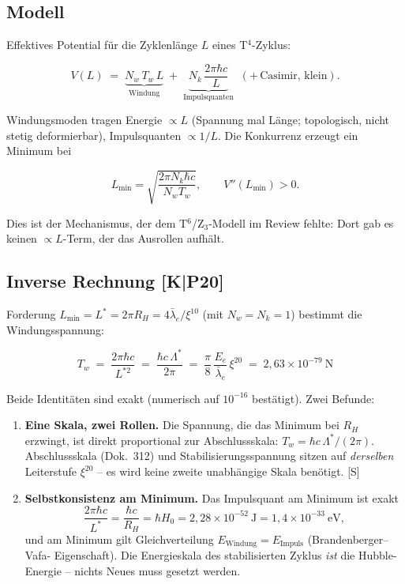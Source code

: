 \subsection{Modell}

Effektives Potential für die Zyklenlänge $L$ eines T$^4$-Zyklus:

\begin{equation}
  V(L) \;=\; \underbrace{N_w\,T_w\,L}_{\text{Windung}}
  \;+\; \underbrace{N_k\,\frac{2\pi\hbar c}{L}}_{\text{Impulsquanten}}
  \;\;(+\,\text{Casimir, klein}).
  \label{eq:pot}
\end{equation}

Windungsmoden tragen Energie $\propto L$ (Spannung mal Länge;
topologisch, nicht stetig deformierbar), Impulsquanten
$\propto 1/L$. Die Konkurrenz erzeugt ein Minimum bei

\begin{equation}
  L_{\min} = \sqrt{\frac{2\pi N_k \hbar c}{N_w T_w}},
  \qquad V''(L_{\min}) > 0.
\end{equation}

Dies ist der Mechanismus, der dem T$^6$/Z$_3$-Modell im Review
fehlte: Dort gab es keinen $\propto L$-Term, der das Ausrollen
aufhält.

\subsection{Inverse Rechnung [K|P20]}

Forderung $L_{\min} = L^{*} = 2\pi R_H = 4\bar\lambda_e/\xi^{10}$
(mit $N_w = N_k = 1$) bestimmt die Windungsspannung:

\begin{equation}
  \boxed{\;T_w \;=\; \frac{2\pi\hbar c}{L^{*2}}
  \;=\; \frac{\hbar c\,\Lambda^{*}}{2\pi}
  \;=\; \frac{\pi}{8}\,\frac{E_e}{\bar\lambda_e}\,\xi^{20}
  \;=\; 2{,}63\times10^{-79}~\text{N}\;}
  \label{eq:tw}
\end{equation}

Beide Identitäten sind exakt (numerisch auf $10^{-16}$ bestätigt).
Zwei Befunde:

\begin{enumerate}
  \item \textbf{Eine Skala, zwei Rollen.} Die Spannung, die das
        Minimum bei $R_H$ erzwingt, ist direkt proportional zur
        Abschlussskala: $T_w = \hbar c\,\Lambda^{*}/(2\pi)$.
        Abschlussskala (Dok.~312) und Stabilisierungsspannung sitzen
        auf \emph{derselben} Leiterstufe $\xi^{20}$ -- es wird keine
        zweite unabhängige Skala benötigt. [S]
  \item \textbf{Selbstkonsistenz am Minimum.} Das Impulsquant am
        Minimum ist exakt
        \[
          \frac{2\pi\hbar c}{L^{*}} = \frac{\hbar c}{R_H}
          = \hbar H_0 = 2{,}28\times10^{-52}~\text{J}
          = 1{,}4\times10^{-33}~\text{eV},
        \]
        und am Minimum gilt Gleichverteilung
        $E_\text{Windung} = E_\text{Impuls}$ (Brandenberger--Vafa-%
        Eigenschaft). Die Energieskala des stabilisierten Zyklus
        \emph{ist} die Hubble-Energie -- nichts Neues muss gesetzt
        werden.
\end{enumerate}

